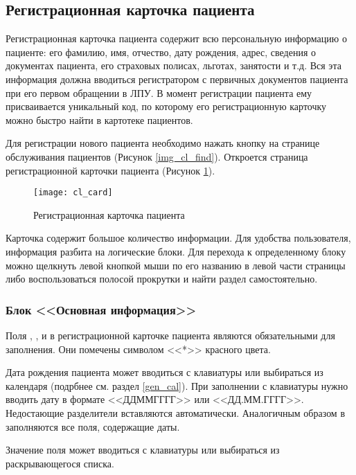 {
\subsection{Регистрационная карточка пациента} \label{cl_card}

Регистрационная карточка пациента содержит всю персональную информацию о пациенте: его фамилию, имя, отчество, дату рождения, адрес, сведения о документах пациента, его страховых полисах, льготах, занятости и т.д. Вся эта информация должна вводиться регистратором с первичных документов пациента при его первом обращении в ЛПУ. В момент регистрации пациента ему присваивается уникальный код, по которому его регистрационную карточку можно быстро найти в картотеке пациентов.

Для регистрации нового пациента необходимо нажать  кнопку  на странице обслуживания пациентов (Рисунок \ref{img_cl_find}). Откроется страница регистрационной карточки пациента (Рисунок \ref{img_cl_card}). 

\begin{figure}[!ht]\centering
 \texttt{[image: cl\_card]}
 \caption{Регистрационная карточка пациента}
 \label{img_cl_card}
\end{figure} 

Карточка содержит большое количество информации. Для удобства пользователя, информация разбита на логические блоки. Для перехода к определенному блоку можно щелкнуть левой кнопкой мыши по его названию в левой части страницы либо воспользоваться полосой прокрутки и найти раздел самостоятельно.  

\subsubsection{Блок <<Основная информация>>}

Поля , ,  и  в регистрационной карточке пациента являются обязательными для заполнения. Они помечены символом <<*>> красного цвета.

Дата рождения пациента может вводиться  с клавиатуры или выбираться из календаря (подрбнее см. раздел \ref{gen_cal}). При заполнении с клавиатуры нужно вводить дату в формате <<ДДММГГГГ>> или <<ДД.ММ.ГГГГ>>. Недостающие разделители вставляются автоматически. Аналогичным образом в \tmis заполняются все поля, содержащие даты.

Значение поля  может вводиться с клавиатуры или выбираться из раскрывающегося списка. 

}
